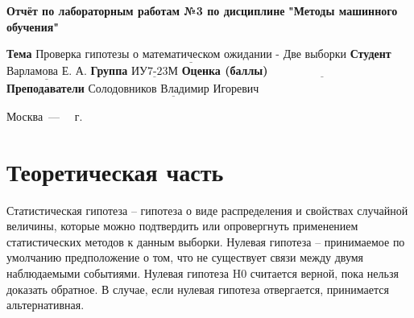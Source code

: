 \documentclass[12pt]{report}
\begin{document}
\begin{titlepage}
	
	\begin{center}
		\noindent\begin{minipage}{1.3\textwidth}\centering
			\Large\textbf{  Отчёт по лабораторным работам №3 по дисциплине}\newline
			\textbf{ "Методы машинного обучения"}\newline\newline
		\end{minipage}
	\end{center}
	
	\noindent\textbf{Тема} $\underline{\text{Проверка гипотезы о математическом ожидании - Две выборки}}$\newline\newline
	\noindent\textbf{Студент} $\underline{\text{Варламова Е. А.}}$\newline\newline
	\noindent\textbf{Группа} $\underline{\text{ИУ7-23М}}$\newline\newline
	\noindent\textbf{Оценка (баллы)} $\underline{\text{~~~~~~~~~~~~~~~~~~~~~~~~~~~}}$\newline\newline
	\noindent\textbf{Преподаватели} $\underline{\text{Солодовников Владимир Игоревич}}$\newline\newline\newline
	
	\begin{center}
		\vfill
		Москва~---~\the\year
		~г.
	\end{center}
\end{titlepage}
\large
\setcounter{page}{2}
\def\contentsname{СОДЕРЖАНИЕ}
\renewcommand{\contentsname}{СОДЕРЖАНИЕ}
\tableofcontents
\renewcommand\labelitemi{---}
\newpage
\chapter{Теоретическая часть}

Статистическая гипотеза -- гипотеза о виде распределения и свойствах случайной величины, которые можно подтвердить или опровергнуть применением статистических методов к данным выборки. Нулевая гипотеза -- принимаемое по умолчанию предположение о том, что не существует связи между двумя наблюдаемыми событиями. Нулевая гипотеза H0 считается верной, пока нельзя доказать обратное. В случае, если нулевая гипотеза отвергается, принимается альтернативная.
\end{document}
